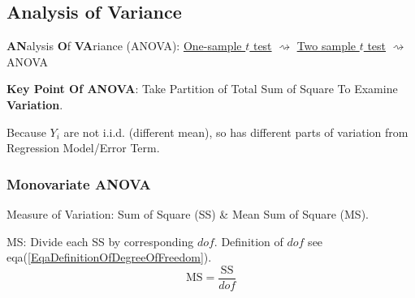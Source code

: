 % 
% 
% 
% 
% 
% 
% 


\subsection{Analysis of Variance}
    \textbf{AN}alysis \textbf{O}f \textbf{VA}riance (ANOVA): \hyperlink{OneSampletTest}{One-sample $ t $ test} $\rightsquigarrow $ \hyperlink{TwoSampletTest}{Two sample $ t $ test} $\rightsquigarrow $ ANOVA

\begin{point}
    \textbf{Key Point Of ANOVA}: Take Partition of Total Sum of Square To Examine \textbf{Variation}.  

    Because $ Y_i $ are not i.i.d. (different mean), so has different parts of variation from Regression Model/Error Term.
\end{point}


\subsubsection{Monovariate ANOVA}

    Measure of Variation: Sum of Square (SS) \& Mean Sum of Square (MS).

    MS: Divide each SS by corresponding $ dof $. Definition of $ dof $ see eqa(\ref{EqaDefinitionOfDegreeOfFreedom}).
    \begin{equation}
        \mathrm{MS}=\dfrac{\mathrm{SS}}{dof} 
    \end{equation}

